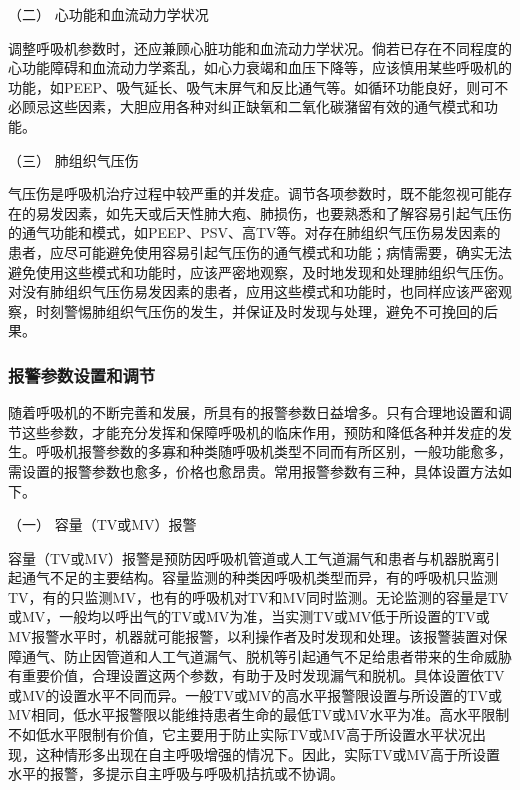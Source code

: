\hypertarget{text00370.htmlux5cux23CHP16-3-4-2-2}{}
（二） 心功能和血流动力学状况

调整呼吸机参数时，还应兼顾心脏功能和血流动力学状况。倘若已存在不同程度的心功能障碍和血流动力学紊乱，如心力衰竭和血压下降等，应该慎用某些呼吸机的功能，如PEEP、吸气延长、吸气末屏气和反比通气等。如循环功能良好，则可不必顾忌这些因素，大胆应用各种对纠正缺氧和二氧化碳潴留有效的通气模式和功能。

\hypertarget{text00370.htmlux5cux23CHP16-3-4-2-3}{}
（三） 肺组织气压伤

气压伤是呼吸机治疗过程中较严重的并发症。调节各项参数时，既不能忽视可能存在的易发因素，如先天或后天性肺大疱、肺损伤，也要熟悉和了解容易引起气压伤的通气功能和模式，如PEEP、PSV、高TV等。对存在肺组织气压伤易发因素的患者，应尽可能避免使用容易引起气压伤的通气模式和功能；病情需要，确实无法避免使用这些模式和功能时，应该严密地观察，及时地发现和处理肺组织气压伤。对没有肺组织气压伤易发因素的患者，应用这些模式和功能时，也同样应该严密观察，时刻警惕肺组织气压伤的发生，并保证及时发现与处理，避免不可挽回的后果。

\subsubsection{报警参数设置和调节}

随着呼吸机的不断完善和发展，所具有的报警参数日益增多。只有合理地设置和调节这些参数，才能充分发挥和保障呼吸机的临床作用，预防和降低各种并发症的发生。呼吸机报警参数的多寡和种类随呼吸机类型不同而有所区别，一般功能愈多，需设置的报警参数也愈多，价格也愈昂贵。常用报警参数有三种，具体设置方法如下。

\hypertarget{text00370.htmlux5cux23CHP16-3-4-3-1}{}
（一） 容量（TV或MV）报警

容量（TV或MV）报警是预防因呼吸机管道或人工气道漏气和患者与机器脱离引起通气不足的主要结构。容量监测的种类因呼吸机类型而异，有的呼吸机只监测TV，有的只监测MV，也有的呼吸机对TV和MV同时监测。无论监测的容量是TV或MV，一般均以呼出气的TV或MV为准，当实测TV或MV低于所设置的TV或MV报警水平时，机器就可能报警，以利操作者及时发现和处理。该报警装置对保障通气、防止因管道和人工气道漏气、脱机等引起通气不足给患者带来的生命威胁有重要价值，合理设置这两个参数，有助于及时发现漏气和脱机。具体设置依TV或MV的设置水平不同而异。一般TV或MV的高水平报警限设置与所设置的TV或MV相同，低水平报警限以能维持患者生命的最低TV或MV水平为准。高水平限制不如低水平限制有价值，它主要用于防止实际TV或MV高于所设置水平状况出现，这种情形多出现在自主呼吸增强的情况下。因此，实际TV或MV高于所设置水平的报警，多提示自主呼吸与呼吸机拮抗或不协调。

